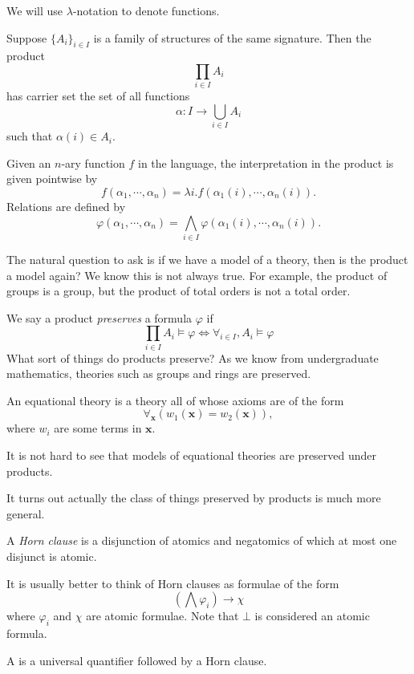 \documentclass[a4paper]{article}
\begin{document}
We will use $\lambda$-notation to denote functions.
\begin{defi}
  Suppose $\{A_i\}_{i \in I}$ is a family of structures of the same signature. Then the product
  \[
    \prod_{i \in I} A_i
  \]
  has carrier set the set of all functions
  \[
    \alpha: I \to \bigcup_{i \in I} A_i
  \]
  such that $\alpha(i) \in A_i$.

  Given an $n$-ary function $f$ in the language, the interpretation in the product is given pointwise by
  \[
    f(\alpha_1, \cdots, \alpha_n) = \lambda i. f(\alpha_1(i), \cdots, \alpha_n(i)).
  \]
  Relations are defined by
  \[
    \varphi(\alpha_1, \cdots, \alpha_n) = \bigwedge_{i \in I} \varphi(\alpha_1(i), \cdots, \alpha_n(i)).
  \]
\end{defi}
The natural question to ask is if we have a model of a theory, then is the product a model again? We know this is not always true. For example, the product of groups is a group, but the product of total orders is not a total order.

We say a product \emph{preserves} a formula $\varphi$ if
\[
  \prod_{i \in I} A_i \vDash \varphi \Longleftrightarrow \forall_{i \in I}, A_i \vDash \varphi
\]
What sort of things do products preserve? As we know from undergraduate mathematics, theories such as groups and rings are preserved.
\begin{defi}
  An equational theory is a theory all of whose axioms are of the form
  \[
    \forall_{\mathbf{x}} (w_1(\mathbf{\mathbf{x}}) = w_2(\mathbf{x})),
  \]
  where $w_i$ are some terms in $\mathbf{x}$.
\end{defi}
It is not hard to see that models of equational theories are preserved under products.

It turns out actually the class of things preserved by products is much more general.

\begin{defi}
  A \emph{Horn clause} is a disjunction of atomics and negatomics of which at most one disjunct is atomic. %

  It is usually better to think of Horn clauses as formulae of the form
  \[
    \left(\bigwedge \varphi_i\right) \to \chi
  \]
  where $\varphi_i$ and $\chi$ are atomic formulae. Note that $\bot$ is considered an atomic formula.

  A  is a universal quantifier followed by a Horn clause.
\end{defi}
\end{document}
